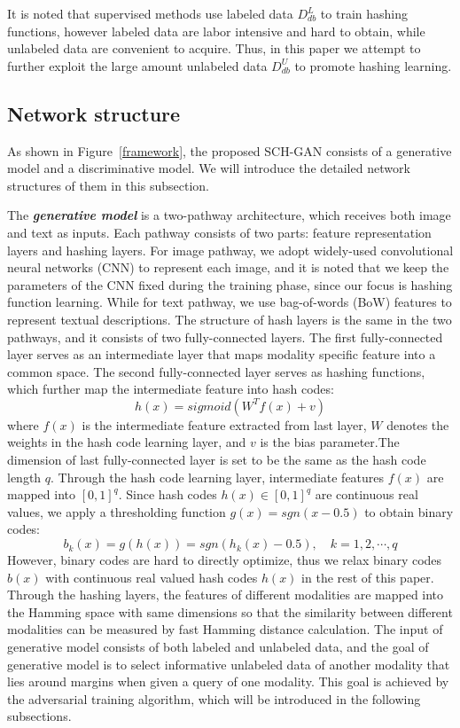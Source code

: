 \documentclass[journal]{IEEEtran}
\begin{document}
It is noted that supervised methods use labeled data $D_{db}^L$ to train hashing functions, however labeled data are labor intensive and hard to obtain, while unlabeled data are convenient to acquire. Thus, in this paper we attempt to further exploit the large amount unlabeled data $D_{db}^U$ to promote hashing learning. 

\subsection{Network structure}
As shown in Figure~\ref{framework}, the proposed SCH-GAN consists of a generative model and a discriminative model. We will introduce the detailed network structures of them in this subsection.

The \textit{\textbf{generative model}} is a two-pathway architecture, which receives both image and text as inputs. Each pathway consists of two parts: feature representation layers and hashing layers. For image pathway, we adopt widely-used convolutional neural networks (CNN) to represent each image, and it is noted that we keep the parameters of the CNN fixed during the training phase, since our focus is hashing function learning. While for text pathway, we use bag-of-words (BoW) features to represent textual descriptions. The structure of hash layers is the same in the two pathways, and it consists of two fully-connected layers. The first fully-connected layer serves as an intermediate layer that maps modality specific feature into a common space. The second fully-connected layer serves as hashing functions, which further map the intermediate feature into hash codes:
\begin{equation}
h(x) = sigmoid(W^Tf(x)+v)
\end{equation}
where $f(x)$ is the intermediate feature extracted from last layer, $W$ denotes the weights in the hash code learning layer, and $v$ is the bias parameter.The dimension of last fully-connected layer is set to be the same as the hash code length $q$. Through the hash code learning layer, intermediate features $f(x)$ are mapped into $[0,1]^q$. Since hash codes $h(x) \in [0,1]^q$ are continuous real values, we apply a thresholding function $g(x)=sgn(x-0.5)$ to obtain binary codes:
\begin{equation}
\label{binarycode}
b_k(x) = g(h(x)) = sgn(h_k(x)-0.5), \quad k=1,2,\cdots,q
\end{equation}
However, binary codes are hard to directly optimize, thus we relax binary codes $b(x)$ with continuous real valued hash codes $h(x)$ in the rest of this paper. Through the hashing layers, the features of different modalities are mapped into the Hamming space with same dimensions so that the similarity between different modalities can be measured by fast Hamming distance calculation. The input of generative model consists of both labeled and unlabeled data, and the goal of generative model is to select informative unlabeled data of another modality that lies around margins when given a query of one modality. This goal is achieved by the adversarial training algorithm, which will be introduced in the following subsections.
\end{document}
